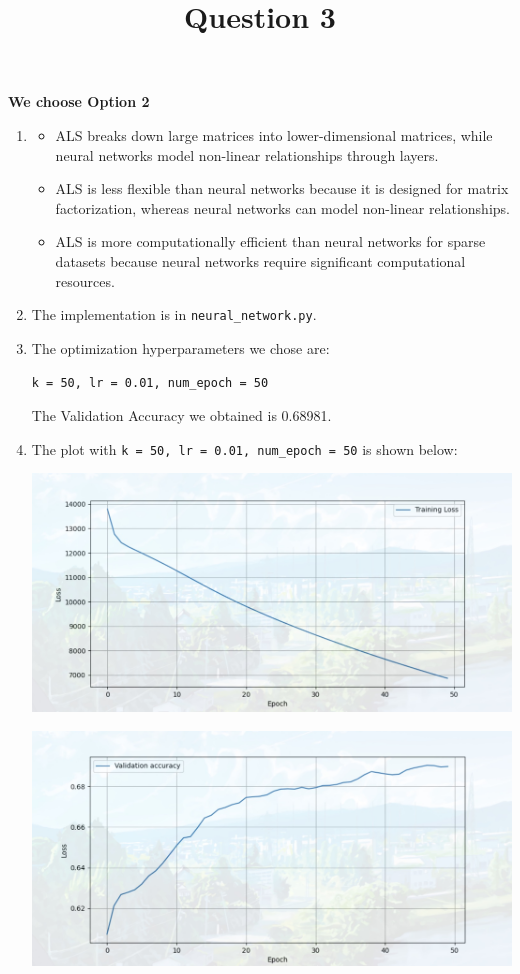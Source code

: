 \documentclass{article}
\title{Question 3}
\date{\vspace{-10.0ex}}
\begin{document}
\maketitle
\thispagestyle{fancy}


\textbf{We choose Option 2}
\begin{enumerate}[label=(\alph*)]
    \item 
    \begin{itemize}
        \item ALS breaks down large matrices into lower-dimensional matrices, while neural networks model non-linear relationships through layers.
        
        \item ALS is less flexible than neural networks because it is designed for matrix factorization, whereas neural networks can model non-linear relationships.
        
        \item ALS is more computationally efficient than neural networks for sparse datasets because neural networks require significant computational resources.
    \end{itemize}

    \item The implementation is in \texttt{neural\_network.py}.
    
    \item The optimization hyperparameters we chose are:
    
    \texttt{k = 50, lr = 0.01, num\_epoch = 50}

    The Validation Accuracy we obtained is 0.68981.

    \item The plot with \texttt{k = 50, lr = 0.01, num\_epoch = 50} is shown below:
    
    \includegraphics[width=0.7\linewidth]{6031723149317_.pic.jpg}

    \includegraphics[width=0.7\linewidth]{6041723149328_.pic.jpg}


\end{enumerate}
\end{document}

